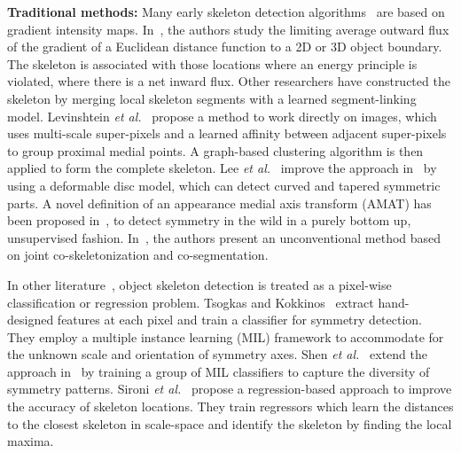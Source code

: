 \documentclass[10pt,twocolumn,letterpaper]{article}
\begin{document}
\noindent\textbf{Traditional methods:}
Many early skeleton detection algorithms~\cite{lindeberg1998edge,liu1998segmenting,jang2001pseudo,yu2004segmentation,nedzved2006gray,zhang2007accurate,lindeberg2013scale} are based on gradient intensity maps. In~\cite{siddiqi2002hamilton}, the authors study the limiting average outward flux of the gradient of a Euclidean distance function to a 2D or 3D object boundary. The skeleton is associated with those locations where an energy principle is violated, where there is a net inward flux. Other researchers have constructed the skeleton by merging local skeleton segments with a learned segment-linking model. Levinshtein {\em et al.}~\cite{levinshtein2013multiscale} propose a method to work directly on images, which uses multi-scale super-pixels and a learned affinity between adjacent super-pixels to group proximal medial points. A graph-based clustering algorithm is then applied to form the complete skeleton. Lee {\em et al.}~\cite{sie2013detecting} improve the approach in~\cite{levinshtein2013multiscale} by using a deformable disc model, which can detect curved and tapered symmetric parts. A novel definition of an appearance medial axis transform (AMAT) has been proposed in~\cite{tsogkas2017amat}, to detect symmetry in the wild in a purely bottom up, unsupervised fashion. In~\cite{jerripothula2017object}, the authors present an unconventional method based on joint co-skeletonization and co-segmentation.

In other literature~\cite{tsogkas2012mil,shen2016misl,sironi2014multiscale}, object skeleton detection is treated as a pixel-wise classification or regression problem. Tsogkas and Kokkinos~\cite{tsogkas2012mil} extract hand-designed features at each pixel and train a classifier for symmetry detection. They employ a multiple instance learning (MIL) framework to accommodate for the unknown scale and orientation of symmetry axes. Shen {\em et al.}~\cite{shen2016misl} extend the approach in~\cite{tsogkas2012mil} by training a group of MIL classifiers to capture the diversity of symmetry patterns. Sironi {\em et al.}~\cite{sironi2014multiscale} propose a regression-based approach to improve the accuracy of skeleton locations. They train regressors which learn the distances to the closest skeleton in scale-space and identify the skeleton by finding the local maxima.

\medskip
\end{document}
